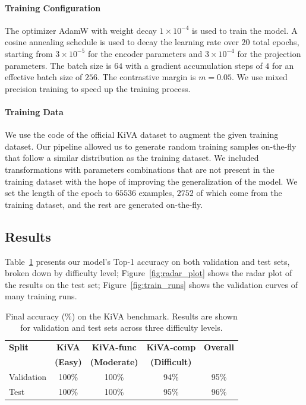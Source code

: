 \documentclass[twocolumn]{article} %
\begin{document}
\paragraph{Training Configuration}
The optimizer AdamW with weight decay $1 \times 10^{-4}$ is used to train the model. 
A cosine annealing schedule is used to decay the learning rate over $20$ total epochs, starting from $3 \times 10^{-5}$ for the encoder parameters and $3 \times 10^{-4}$ for the projection parameters. The batch size is $64$ with a gradient accumulation steps of $4$ for an effective batch size of $256$. The contrastive margin is $m = 0.05$.
We use mixed precision training to speed up the training process.

\paragraph{Training Data}
We use the code of the official KiVA dataset\cite{yee2025kiva} to augment the given training dataset. Our pipeline allowed us to generate random training samples on-the-fly that follow a similar distribution as the training dataset. We included transformations with parameters combinations that are not present in the training dataset with the hope of improving the generalization of the model. We set the length of the epoch to $65536$ examples, $2752$ of which come from the training dataset, and the rest are generated on-the-fly.

\subsection{Results}

Table~\ref{tab:kiva_results} presents our model's Top-1 accuracy on both validation and test sets, broken down by difficulty level; Figure~\ref{fig:radar_plot} shows the radar plot of the results on the test set; Figure~\ref{fig:train_runs} shows the validation curves of many training runs.

\begin{table}[!htb]
    \caption{Final accuracy (\%) on the KiVA benchmark. Results are shown for validation and test sets across three difficulty levels.}
    \label{tab:kiva_results}
    \centering
    \setlength{\tabcolsep}{5pt} %
    \begin{tabular}{lcccc}
        \toprule
        \textbf{Split} & \textbf{KiVA} & \textbf{KiVA-func} & \textbf{KiVA-comp} & \textbf{Overall} \\
        & \textbf{(Easy)} & \textbf{(Moderate)} & \textbf{(Difficult)} & \\
        \midrule
        Validation & 100\% & 100\% & 94\% & 95\% \\
        Test & 100\% & 100\% & 95\% & 96\% \\
        \bottomrule
    \end{tabular}
\end{table}
\end{document}
